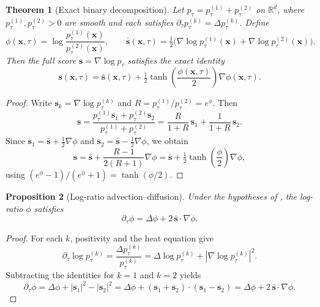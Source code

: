 \documentclass[11pt]{article}
\newtheorem{theorem}{Theorem}[section]
\newtheorem{proposition}[theorem]{Proposition}
\newcommand{\R}{\mathbb{R}}
\begin{document}
\begin{theorem}[Exact binary decomposition]\label{thm:local-tanh}
Let $p_\tau = p_\tau^{(1)} + p_\tau^{(2)}$ on $\R^d$, where $p_\tau^{(1)},p_\tau^{(2)}>0$ are smooth and each satisfies $\partial_\tau p_\tau^{(k)} = \Delta p_\tau^{(k)}$.
Define
\begin{equation}\label{eq:local-phi-def}
  \phi(\bm{x},\tau) = \log \frac{p_\tau^{(1)}(\bm{x})}{p_\tau^{(2)}(\bm{x})},
  \qquad
  \bar{\bm{s}}(\bm{x},\tau) = \tfrac{1}{2}\bigl(\nabla \log p_\tau^{(1)}(\bm{x}) + \nabla \log p_\tau^{(2)}(\bm{x})\bigr).
\end{equation}
Then the full score $\bm{s} = \nabla \log p_\tau$ satisfies the exact identity
\begin{equation}\label{eq:local-tanh}
  \bm{s}(\bm{x},\tau)
  = \bar{\bm{s}}(\bm{x},\tau) + \tfrac{1}{2}\tanh\!\left(\frac{\phi(\bm{x},\tau)}{2}\right)\nabla\phi(\bm{x},\tau).
\end{equation}
\end{theorem}

\begin{proof}
Write $\bm{s}_k = \nabla\log p_\tau^{(k)}$ and $R = p_\tau^{(1)}/p_\tau^{(2)} = e^{\phi}$.
Then
\[
  \bm{s}
  = \frac{p_\tau^{(1)}\bm{s}_1 + p_\tau^{(2)}\bm{s}_2}{p_\tau^{(1)} + p_\tau^{(2)}}
  = \frac{R}{1+R}\,\bm{s}_1 + \frac{1}{1+R}\,\bm{s}_2.
\]
Since $\bm{s}_1 = \bar{\bm{s}} + \tfrac{1}{2}\nabla\phi$ and $\bm{s}_2 = \bar{\bm{s}} - \tfrac{1}{2}\nabla\phi$, we obtain
\[
  \bm{s}
  = \bar{\bm{s}} + \frac{R-1}{2(R+1)}\nabla\phi
  = \bar{\bm{s}} + \tfrac{1}{2}\tanh\!\left(\frac{\phi}{2}\right)\nabla\phi,
\]
using $(e^{\phi}-1)/(e^{\phi}+1)=\tanh(\phi/2)$.
\end{proof}

\begin{proposition}[Log-ratio advection--diffusion]\label{prop:local-phi-pde}
Under the hypotheses of , the log-ratio $\phi$ satisfies
\begin{equation}\label{eq:local-phi-pde}
  \partial_\tau \phi = \Delta \phi + 2\,\bar{\bm{s}}\cdot\nabla\phi.
\end{equation}
\end{proposition}

\begin{proof}
For each $k$, positivity and the heat equation give
\[
  \partial_\tau \log p_\tau^{(k)}
  = \frac{\Delta p_\tau^{(k)}}{p_\tau^{(k)}}
  = \Delta \log p_\tau^{(k)} + |\nabla\log p_\tau^{(k)}|^2.
\]
Subtracting the identities for $k=1$ and $k=2$ yields
\[
  \partial_\tau \phi
  = \Delta\phi + |\bm{s}_1|^2 - |\bm{s}_2|^2
  = \Delta\phi + (\bm{s}_1+\bm{s}_2)\cdot(\bm{s}_1-\bm{s}_2)
  = \Delta\phi + 2\,\bar{\bm{s}}\cdot\nabla\phi.
\]
\end{proof}
\end{document}
